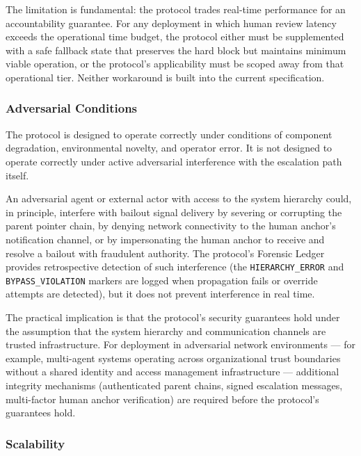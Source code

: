 The limitation is fundamental: the protocol trades real-time performance for an accountability guarantee. For any deployment in which human review latency exceeds the operational time budget, the protocol either must be supplemented with a safe fallback state that preserves the hard block but maintains minimum viable operation, or the protocol's applicability must be scoped away from that operational tier. Neither workaround is built into the current specification.

\subsubsection{Adversarial Conditions}\label{sec:adversarial-conditions}

The protocol is designed to operate correctly under conditions of component degradation, environmental novelty, and operator error. It is not designed to operate correctly under active adversarial interference with the escalation path itself.

An adversarial agent or external actor with access to the system hierarchy could, in principle, interfere with bailout signal delivery by severing or corrupting the parent pointer chain, by denying network connectivity to the human anchor's notification channel, or by impersonating the human anchor to receive and resolve a bailout with fraudulent authority. The protocol's Forensic Ledger provides retrospective detection of such interference (the \texttt{HIERARCHY\_ERROR} and \texttt{BYPASS\_VIOLATION} markers are logged when propagation fails or override attempts are detected), but it does not prevent interference in real time.

The practical implication is that the protocol's security guarantees hold under the assumption that the system hierarchy and communication channels are trusted infrastructure. For deployment in adversarial network environments --- for example, multi-agent systems operating across organizational trust boundaries without a shared identity and access management infrastructure --- additional integrity mechanisms (authenticated parent chains, signed escalation messages, multi-factor human anchor verification) are required before the protocol's guarantees hold.

\subsubsection{Scalability}\label{sec:scalability}

